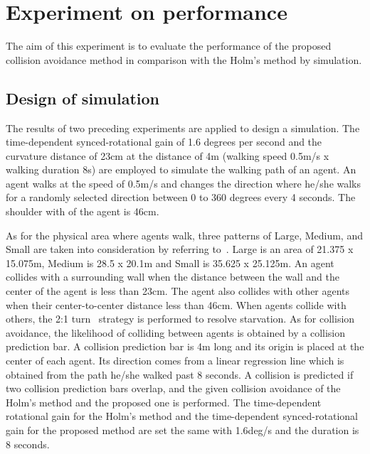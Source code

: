 \chapter{Experiment on performance} %

\label{Chapter4} %






The aim of this experiment is to evaluate the performance of the proposed collision avoidance method in comparison with the Holm's method by simulation.

\section{Design of simulation}
The results of two preceding experiments are applied to design a simulation. The time-dependent synced-rotational gain of 1.6 degrees per second and the curvature distance of 23cm at the distance of 4m (walking speed 0.5m/s x walking duration 8s) are employed to simulate the walking path of an agent. An agent walks at the speed of 0.5m/s and changes the direction where he/she walks for a randomly selected direction between 0 to 360 degrees every 4 seconds. The shoulder with of the agent is 46cm.



As for the physical area where agents walk, three patterns of Large, Medium, and Small are taken into consideration by referring to~\cite{PMID:18183898}. Large is an area of 21.375 x 15.075m, Medium is 28.5 x 20.1m and Small is 35.625 x 25.125m. An agent collides with a surrounding wall when the distance between the wall and the center of the agent is less than 23cm. The agent also collides with other agents when their center-to-center distance less than 46cm. When agents collide with others, the 2:1 turn~\cite{8798319} strategy is performed to resolve starvation. As for collision avoidance, the likelihood of colliding between agents is obtained by a collision prediction bar. A collision prediction bar is 4m long and its origin is placed at the center of each agent. Its direction comes from a linear regression line which is obtained from the path he/she walked past 8 seconds. A collision is predicted if two collision prediction bars overlap, and the given collision avoidance of the Holm's method and the proposed one is performed. The time-dependent rotational gain for the Holm's method and the time-dependent synced-rotational gain for the proposed method are set the same with 1.6deg/s and the duration is 8 seconds.

